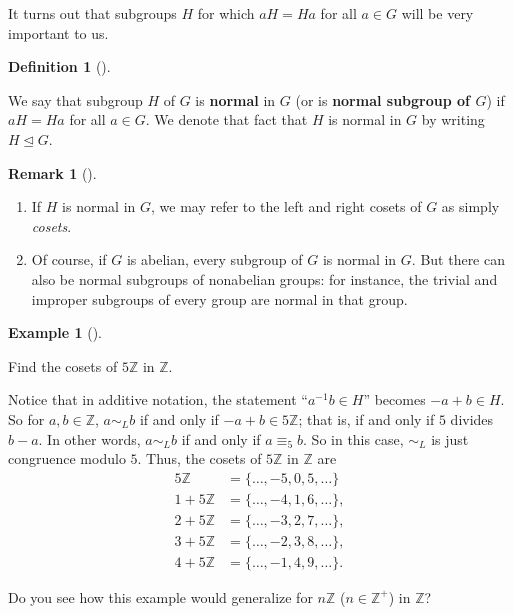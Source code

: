 \documentclass[10pt,]{book}
\newcommand{\terminology}[1]{\textbf{#1}}
\theoremstyle{plain}
\theoremstyle{definition}
\newtheorem{definition}[theorem]{Definition}
\theoremstyle{definition}
\newtheorem{remark}[theorem]{Remark}
\theoremstyle{definition}
\newtheorem{example}[theorem]{Example}
\theoremstyle{definition}
\numberwithin{equation}{section}
\def\Z{\mathbb{Z}}
\def\siml{\sim_L}
\newcommand{\amp}{ & }
\begin{document}
    It turns out that subgroups \(H\) for which \(aH=Ha\) for all \(a\in
    G\) will be very important to us.
\begin{definition}[{}]\label{definition-60}

        We say that subgroup \(H\) of \(G\) is \terminology{normal} in \(G\) (or is  \terminology{normal subgroup of \(G\)})
        if \(aH=Ha\) for all \(a\in G\). We denote that fact that \(H\) is
        normal in \(G\) by writing \(H\unlhd G\).
\label{notation-69}
\end{definition}
\begin{remark}[]\label{remark-40}
\leavevmode%
\begin{enumerate}
\item\hypertarget{li-414}{}
          If \(H\) is normal in \(G\), we may refer to the left and
          right cosets of \(G\) as simply \emph{cosets}.
\item\hypertarget{li-415}{}
          Of course, if \(G\) is abelian, every subgroup of \(G\) is normal in \(G\).
          But there can also be normal subgroups of nonabelian groups: for instance, the trivial and improper
          subgroups of every group are normal in that group.
\end{enumerate}
\end{remark}
\begin{example}[]\label{example-73}

        Find the cosets of \(5\Z\) in \(\Z\).
\par

        Notice that in additive notation, the statement ``\(a^{-1}b\in H\)''
        becomes \(-a+b\in H\). So for \(a,b\in \Z\), \(a\siml b\) if and only if \(-a+b \in
        5\Z\); that is, if and only if \(5\) divides \(b-a\). In other words, \(a\siml b\) if and only if \(a\equiv_5 b\). So
        in this case, \(\siml\) is just congruence modulo \(5\). Thus, the cosets of \(5\Z\) in \(\Z\) are
\begin{align*}
5\Z\amp =\{\ldots,-5,0,5,\ldots\}\\
1+5\Z\amp =\{\ldots,-4, 1,
          6,\ldots\},\\
2+5\Z\amp =\{\ldots,-3,2, 7,
          \ldots\},\\
3+5\Z\amp =\{\ldots,-2,3, 8,
          \ldots\},\\
4+5\Z\amp =\{\ldots,-1, 4, 9,
          \ldots\}.
\end{align*}

\par

        Do you see how this example would
        generalize for \(n\Z\) (\(n \in \Z^+\)) in \(\Z\)?
\end{example}
\end{document}
